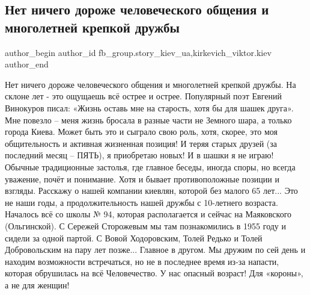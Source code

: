  
 
 
 
 
 
\subsection{Нет ничего дороже человеческого общения и многолетней крепкой дружбы}
\label{sec:14_12_2021.fb.fb_group.story_kiev_ua.1.chelovek_druzhba}
 
\ifcmt
 author_begin
   author_id fb_group.story_kiev_ua,kirkevich_viktor.kiev
 author_end
\fi

Нет ничего дороже человеческого общения и многолетней крепкой дружбы. На склоне
лет - это ощущаешь всё острее и острее. Популярный поэт Евгений Винокуров
писал: «Жизнь оставь мне на старость, хотя бы для шашек друга». Мне повезло –
меня жизнь бросала в разные части не Земного шара, а только города Киева. Может
быть это и сыграло свою роль, хотя, скорее, это моя общительность и активная
жизненная позиция! И теряя старых друзей (за последний месяц – ПЯТЬ), я
приобретаю новых! И в шашки я не играю! Обычные традиционные застолья, где
главное беседы, иногда споры, но всегда уважение, почёт и понимание. Хотя и
бывает противоположные позиции и взгляды. Расскажу о нашей компании киевлян,
которой без малого 65 лет... Это не наши годы, а продолжительность нашей дружбы с
10-летнего возраста. Началось всё со школы № 94, которая располагается и сейчас
на Маяковского (Ольгинской). С Сережей Сторожевым мы там познакомились в 1955
году и сидели за одной партой. С Вовой Ходоровским, Толей Редько и Толей
Добровольским на пару лет позже... Главное в другом. Мы дружим по сей день и
находим возможности встречаться, но не в последнее время из-за напасти, которая
обрушилась на всё Человечество. У нас опасный возраст! Для «короны», а не для
женщин!

\begin{multicols}{2} %
\setlength{\parindent}{0pt}

\end{multicols} %

